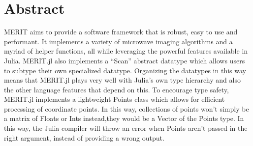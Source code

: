 \chapter*{Abstract}


MERIT aims to provide a software framework that is robust, easy to use and performant. It implements a variety of
microwave imaging algorithms and a myriad of helper functions, all while leveraging the powerful features available in
Julia. MERIT.jl also implements a ``Scan'' abstract datatype which allows users to subtype their own specialized datatype.
Organizing the datatypes in this way means that MERIT.jl plays very well with Julia's own type hierarchy and also the
other language features that depend on this. To encourage type safety, MERIT.jl implements a lightweight Points class
which allows for efficient processing of coordinate points. In this way, collections of points won't simply be a matrix
of Floats or Ints instead,they would be a Vector of the Points type. In this way, the Julia compiler will throw an
error when Points aren't passed in the right argument, instead of providing a wrong output.      
\newpage
